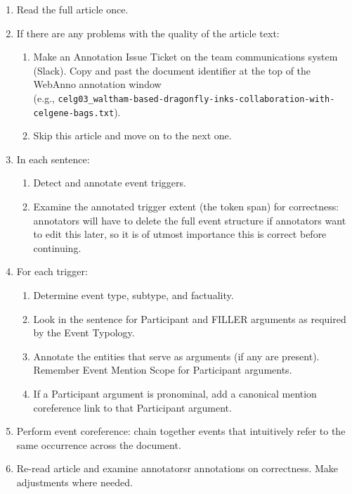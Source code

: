 \bigskip
\begin{enumerate}[leftmargin=*]
    \item Read the full article once.
    \item If there are any problems with the quality of the article text:
        \begin{enumerate}
            \item Make an Annotation Issue Ticket on the team communications system (Slack). Copy and past the document identifier at the top of the WebAnno annotation window\\(e.g., \texttt{celg03\_waltham-based-dragonfly-inks-collaboration-with-celgene-bags.txt}).
            \item Skip this article and move on to the next one.
        \end{enumerate}

    \item In each sentence:
        \begin{enumerate}
            \item Detect and annotate event triggers.
            \item Examine the annotated trigger extent (the token span) for correctness: annotators will have to delete the full event structure if annotators want to edit this later, so it is of utmost importance this is correct before continuing.
        \end{enumerate}
        \item For each trigger:
            \begin{enumerate}
                \item Determine event type, subtype, and factuality.
                \item Look in the sentence for Participant and FILLER arguments as required by the Event Typology.
                \item Annotate the entities that serve as arguments (if any are present). Remember Event Mention Scope for Participant arguments.
                \item If a Participant argument is pronominal, add a canonical mention coreference link to that Participant argument.
            \end{enumerate}
    \item Perform event coreference: chain together events that intuitively refer to the same occurrence across the document.
    \item Re-read article and examine annotatorsr annotations on correctness.
    Make adjustments where needed.
\end{enumerate}


